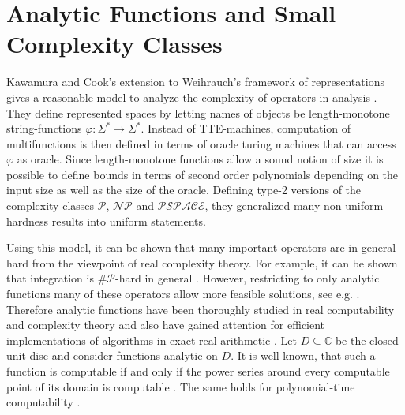 \documentclass{article}
\newcommand{\CC}{\mathbb C}
\newcommand{\p}{\ensuremath{\mathcal P}\xspace}
\newcommand{\np}{\ensuremath{\mathcal{NP}}\xspace}
\newcommand{\sharpp}{\ensuremath{\# \mathcal{P}}\xspace}
\newcommand{\pspace}{\ensuremath{ \mathcal{PSPACE}}\xspace}
\begin{document}
\section*{Analytic Functions and Small Complexity Classes}
Kawamura and Cook's extension to Weihrauch's framework of representations \cite{Weihrauch} gives a reasonable model to analyze the complexity of operators in analysis \cite{AkiACM}.
They define represented spaces by letting names of objects be length-monotone string-functions $\varphi: \Sigma^* \to \Sigma^*$. 
Instead of TTE-machines, computation of multifunctions is then defined in terms of oracle turing machines that can access $\varphi$ as oracle.
Since length-monotone functions allow a sound notion of size it is possible to define bounds in terms of second order polynomials depending on the input size as well as the size of the oracle.
Defining type-2 versions of the complexity classes \p, \np and \pspace, they generalized many non-uniform hardness results into uniform statements.

Using this model, it can be shown that many important operators are in general hard from the viewpoint of real complexity theory. 
For example, it can be shown that integration is \sharpp-hard in general \cite{MR748898,AkiACM}.
However, restricting to only analytic functions many of these operators allow more feasible solutions, see e.g. \cite{MR1137517, Kawamura2012}.  
Therefore analytic functions have been thoroughly studied in real computability and complexity theory and also have gained attention for efficient implementations of algorithms in exact real arithmetic \cite{DBLP:journals/corr/abs-1006-0401}.
Let $D \subseteq \CC$ be the closed unit disc and consider functions analytic on $D$.
It is well known, that such a function is computable if and only if the power series around every computable point of its domain is computable \cite{MR1005942}.
The same holds for polynomial-time computability \cite{MR1137517}. 
\end{document}
